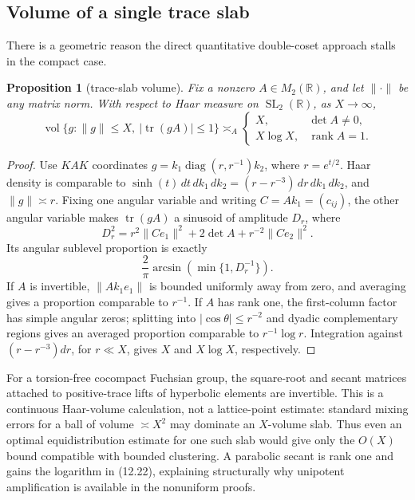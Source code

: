 \documentclass[11pt,reqno]{amsart}
\newtheorem{proposition}[theorem]{Proposition}
\theoremstyle{definition}
\theoremstyle{remark}
\newcommand{\R}{\mathbb R}
\newcommand{\Tr}{\operatorname{tr}}
\newcommand{\SL}{\operatorname{SL}}
\newcommand{\diag}{\operatorname{diag}}
\begin{document}
\subsection{Volume of a single trace slab}

There is a geometric reason the direct quantitative double-coset approach
stalls in the compact case.

\begin{proposition}[trace-slab volume]\label{prop:slab}
Fix a nonzero \(A\in M_2(\R)\), and let \(\|\cdot\|\) be any matrix norm.  With
respect to Haar measure on \(\SL_2(\R)\), as \(X\to\infty\),
\[
 \operatorname{vol}\{g:\|g\|\le X,\ |\Tr(gA)|\le1\}
 \asymp_A
 \begin{cases}
 X,&\det A\ne0,\\
 X\log X,&\operatorname{rank}A=1.
 \end{cases}
\tag{12.22}
\]
\end{proposition}

\begin{proof}
Use \(KAK\) coordinates
\(g=k_1\diag(r,r^{-1})k_2\), where \(r=e^{t/2}\).  Haar density is comparable
to \(\sinh(t)\,dt\,dk_1\,dk_2=(r-r^{-3})\,dr\,dk_1\,dk_2\), and
\(\|g\|\asymp r\).  Fixing one angular variable and writing
\(C=Ak_1=(c_{ij})\), the other angular variable makes \(\Tr(gA)\) a sinusoid
of amplitude \(D_r\), where
\[
 D_r^2=r^2\|C e_1\|^2+2\det A+r^{-2}\|C e_2\|^2.
\]
Its angular sublevel proportion is exactly
\[
 \frac2\pi\arcsin\!\left(\min\{1,D_r^{-1}\}\right).
\]
If \(A\) is invertible, \(\|Ak_1e_1\|\) is bounded uniformly away from zero,
and averaging gives a proportion comparable to \(r^{-1}\).  If \(A\) has
rank one, the first-column factor has simple angular zeros; splitting into
\(|\cos\theta|\le r^{-2}\) and dyadic complementary regions gives an averaged
proportion comparable to \(r^{-1}\log r\).  Integration against
\((r-r^{-3})dr\), for \(r\ll X\), gives \(X\) and \(X\log X\), respectively.
\end{proof}

For a torsion-free cocompact Fuchsian group, the square-root and secant matrices
attached to positive-trace lifts of hyperbolic elements are invertible.  This
is a continuous Haar-volume calculation, not a lattice-point estimate:
standard mixing errors for a ball of volume \(\asymp X^2\) may dominate an
\(X\)-volume slab.  Thus even an optimal equidistribution estimate for one
such slab would give only the \(O(X)\) bound compatible with bounded
clustering.  A parabolic secant is rank one and gains the logarithm in (12.22),
explaining structurally why unipotent amplification is available in the
nonuniform proofs.
\end{document}

